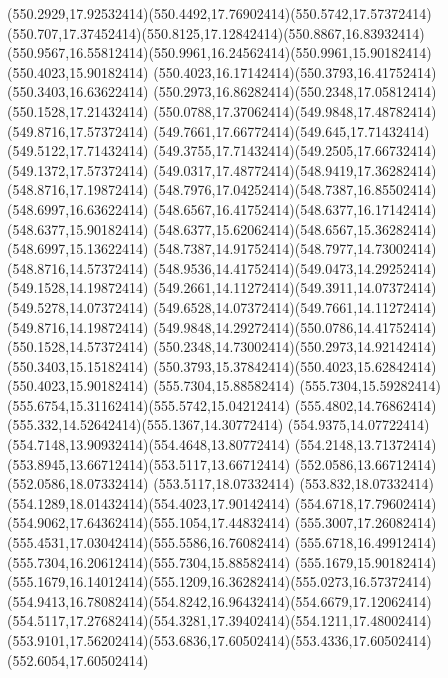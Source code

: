 {{	\curveto(550.2929,17.92532414)(550.4492,17.76902414)(550.5742,17.57372414)
	\curveto(550.707,17.37452414)(550.8125,17.12842414)(550.8867,16.83932414)
	\curveto(550.9567,16.55812414)(550.9961,16.24562414)(550.9961,15.90182414)
	\closepath
	\moveto(550.4023,15.90182414)
	\curveto(550.4023,16.17142414)(550.3793,16.41752414)(550.3403,16.63622414)
	\curveto(550.2973,16.86282414)(550.2348,17.05812414)(550.1528,17.21432414)
	\curveto(550.0788,17.37062414)(549.9848,17.48782414)(549.8716,17.57372414)
	\curveto(549.7661,17.66772414)(549.645,17.71432414)(549.5122,17.71432414)
	\curveto(549.3755,17.71432414)(549.2505,17.66732414)(549.1372,17.57372414)
	\curveto(549.0317,17.48772414)(548.9419,17.36282414)(548.8716,17.19872414)
	\curveto(548.7976,17.04252414)(548.7387,16.85502414)(548.6997,16.63622414)
	\curveto(548.6567,16.41752414)(548.6377,16.17142414)(548.6377,15.90182414)
	\curveto(548.6377,15.62062414)(548.6567,15.36282414)(548.6997,15.13622414)
	\curveto(548.7387,14.91752414)(548.7977,14.73002414)(548.8716,14.57372414)
	\curveto(548.9536,14.41752414)(549.0473,14.29252414)(549.1528,14.19872414)
	\curveto(549.2661,14.11272414)(549.3911,14.07372414)(549.5278,14.07372414)
	\curveto(549.6528,14.07372414)(549.7661,14.11272414)(549.8716,14.19872414)
	\curveto(549.9848,14.29272414)(550.0786,14.41752414)(550.1528,14.57372414)
	\curveto(550.2348,14.73002414)(550.2973,14.92142414)(550.3403,15.15182414)
	\curveto(550.3793,15.37842414)(550.4023,15.62842414)(550.4023,15.90182414)
	\closepath
	\moveto(555.7304,15.88582414)
	\curveto(555.7304,15.59282414)(555.6754,15.31162414)(555.5742,15.04212414)
	\curveto(555.4802,14.76862414)(555.332,14.52642414)(555.1367,14.30772414)
	\curveto(554.9375,14.07722414)(554.7148,13.90932414)(554.4648,13.80772414)
	\curveto(554.2148,13.71372414)(553.8945,13.66712414)(553.5117,13.66712414)
	\lineto(552.0586,13.66712414)
	\lineto(552.0586,18.07332414)
	\lineto(553.5117,18.07332414)
	\curveto(553.832,18.07332414)(554.1289,18.01432414)(554.4023,17.90142414)
	\curveto(554.6718,17.79602414)(554.9062,17.64362414)(555.1054,17.44832414)
	\curveto(555.3007,17.26082414)(555.4531,17.03042414)(555.5586,16.76082414)
	\curveto(555.6718,16.49912414)(555.7304,16.20612414)(555.7304,15.88582414)
	\closepath
	\moveto(555.1679,15.90182414)
	\curveto(555.1679,16.14012414)(555.1209,16.36282414)(555.0273,16.57372414)
	\curveto(554.9413,16.78082414)(554.8242,16.96432414)(554.6679,17.12062414)
	\curveto(554.5117,17.27682414)(554.3281,17.39402414)(554.1211,17.48002414)
	\curveto(553.9101,17.56202414)(553.6836,17.60502414)(553.4336,17.60502414)
	\lineto(552.6054,17.60502414)
}}
